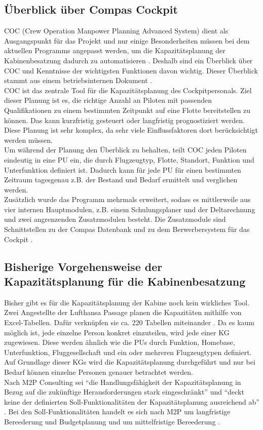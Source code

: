 \documentclass [12pt, a4paper, oneside, titlepage, ngerman]{article}
\begin{document}
\subsection{Überblick über Compas Cockpit}
\ac{COC} (Crew Operation Manpower Planning Advanced System) dient als Ausgangspunkt für das Projekt und nur einige Besonderheiten müssen bei dem aktuellen Programms angepasst werden, um die Kapazitätsplanung der Kabinenbesatzung dadurch zu automatisieren \cite[vgl.][]{Gespraech1}. Deshalb sind ein Überblick über \ac{COC} und Kenntnisse der wichtigsten Funktionen davon wichtig. Dieser Überblick stammt aus einem betriebsinternen Dokument \cite[vgl.][]{compasdoku}. \\
\ac{COC} ist das zentrale Tool für die Kapazitätsplanung des Cockpitpersonals. Ziel dieser Planung ist es, die richtige Anzahl an Piloten mit passenden Qualifikationen zu einem bestimmten Zeitpunkt auf eine Flotte bereitstellen zu können. Das kann kurzfristig gesteuert oder langfristig prognostiziert werden. Diese Planung ist sehr komplex, da sehr viele Einflussfaktoren dort berücksichtigt werden müssen. \\
Um während der Planung den Überblick zu behalten, teilt \ac{COC} jeden Piloten eindeutig in eine \ac{PU} ein, die durch Flugzeugtyp, Flotte, Standort, Funktion und Unterfunktion definiert ist. Dadurch kann für jede \ac{PU} für einen bestimmten Zeitraum tagesgenau z.B. der Bestand und Bedarf ermittelt und verglichen werden. \\

\noindent Zusätzlich wurde das Programm mehrmals erweitert, sodass es mittlerweile aus vier internen Hauptmodulen, z.B. einem Schulungsplaner und der Deltarechnung und zwei angrenzenden Zusatzmodulen besteht. Die Zusatzmodule sind Schnittstellen zu der Compas Datenbank und zu dem Berwerbersystem für das Cockpit \cite[vgl.][S.19]{compasdoku}.


\subsection{Bisherige Vorgehensweise der Kapazitätsplanung für die Kabinenbesatzung} \label{vorgehensweise}
Bisher gibt es für die Kapazitätsplanung der Kabine noch kein wirkliches Tool. Zwei Angestellte der Lufthansa Passage planen die Kapazitäten mithilfe von Excel-Tabellen. Dafür verknüpfen sie ca. 220 Tabellen miteinander \cite[vgl.][]{Gespraech2}. Da es kaum möglich ist, jede einzelne Person konkret einzuteilen, wird jede einer \ac{KG} zugewiesen. Diese werden ähnlich wie die \acp{PU} durch Funktion, Homebase, Unterfunktion, Fluggesellschaft und ein oder mehreren Flugzeugtypen definiert. Auf Grundlage dieser \acp{KG} wird die Kapazitätsplanung durchgeführt und nur bei Bedarf können einzelne Personen genauer betrachtet werden.  \\
Nach M2P Consulting sei "`die Handlungsfähigkeit der Kapazitätsplanung in Bezug auf die zukünftige Herausforderungen stark eingeschränkt"' \cite[S.5]{M2P} und "`deckt keine der definierten Soll-Funktionalitäten der Kapazitätsplanung ausreichend ab"' \cite[S.6]{M2P}. Bei den Soll-Funktionalitäten handelt es sich nach M2P um langfristige Bereederung und Budgetplanung und um mittelfristige Bereederung \cite[vgl.][S.6]{M2P}.
\end{document}

